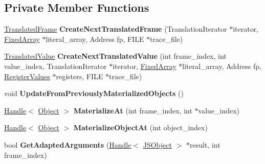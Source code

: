 \subsection*{Private Member Functions}
\begin{DoxyCompactItemize}
\item 
\hyperlink{classv8_1_1internal_1_1_translated_frame}{Translated\+Frame} {\bfseries Create\+Next\+Translated\+Frame} (Translation\+Iterator $\ast$iterator, \hyperlink{classv8_1_1internal_1_1_fixed_array}{Fixed\+Array} $\ast$literal\+\_\+array, Address fp, F\+I\+LE $\ast$trace\+\_\+file)\hypertarget{classv8_1_1internal_1_1_translated_state_a5426a850016b40376c1bec403a80c003}{}\label{classv8_1_1internal_1_1_translated_state_a5426a850016b40376c1bec403a80c003}

\item 
\hyperlink{classv8_1_1internal_1_1_translated_value}{Translated\+Value} {\bfseries Create\+Next\+Translated\+Value} (int frame\+\_\+index, int value\+\_\+index, Translation\+Iterator $\ast$iterator, \hyperlink{classv8_1_1internal_1_1_fixed_array}{Fixed\+Array} $\ast$literal\+\_\+array, Address fp, \hyperlink{classv8_1_1internal_1_1_register_values}{Register\+Values} $\ast$registers, F\+I\+LE $\ast$trace\+\_\+file)\hypertarget{classv8_1_1internal_1_1_translated_state_a5dc4be016b4b1e38de686ba6cd12c4fe}{}\label{classv8_1_1internal_1_1_translated_state_a5dc4be016b4b1e38de686ba6cd12c4fe}

\item 
void {\bfseries Update\+From\+Previously\+Materialized\+Objects} ()\hypertarget{classv8_1_1internal_1_1_translated_state_ae13d5635d69b456e74ae98754671e404}{}\label{classv8_1_1internal_1_1_translated_state_ae13d5635d69b456e74ae98754671e404}

\item 
\hyperlink{classv8_1_1internal_1_1_handle}{Handle}$<$ \hyperlink{classv8_1_1internal_1_1_object}{Object} $>$ {\bfseries Materialize\+At} (int frame\+\_\+index, int $\ast$value\+\_\+index)\hypertarget{classv8_1_1internal_1_1_translated_state_a5bbefd1740d05aef2422c5275bd65041}{}\label{classv8_1_1internal_1_1_translated_state_a5bbefd1740d05aef2422c5275bd65041}

\item 
\hyperlink{classv8_1_1internal_1_1_handle}{Handle}$<$ \hyperlink{classv8_1_1internal_1_1_object}{Object} $>$ {\bfseries Materialize\+Object\+At} (int object\+\_\+index)\hypertarget{classv8_1_1internal_1_1_translated_state_a48d2f37c98d5a407bcc29b3d6004dbf2}{}\label{classv8_1_1internal_1_1_translated_state_a48d2f37c98d5a407bcc29b3d6004dbf2}

\item 
bool {\bfseries Get\+Adapted\+Arguments} (\hyperlink{classv8_1_1internal_1_1_handle}{Handle}$<$ \hyperlink{classv8_1_1internal_1_1_j_s_object}{J\+S\+Object} $>$ $\ast$result, int frame\+\_\+index)\hypertarget{classv8_1_1internal_1_1_translated_state_ad87be7e87acc4a7ac82c70acb5e991ee}{}\label{classv8_1_1internal_1_1_translated_state_ad87be7e87acc4a7ac82c70acb5e991ee}

\end{DoxyCompactItemize}
